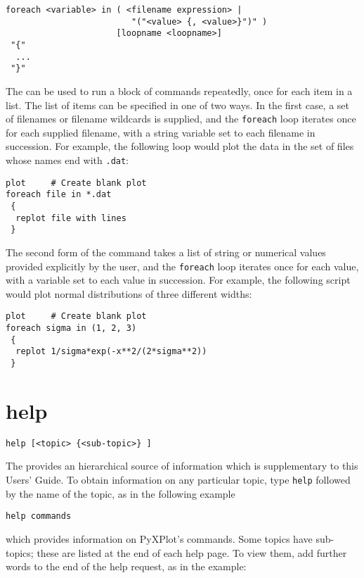 \begin{verbatim}
foreach <variable> in ( <filename expression> |
                         "("<value> {, <value>}")" )
                      [loopname <loopname>]
 "{"
  ...
 "}"
\end{verbatim}

The  can be used to run a block of commands repeatedly, once
for each item in a list.  The list of items can be specified in one of two
ways.  In the first case, a set of filenames or filename wildcards is supplied,
and the {\tt foreach} loop iterates once for each supplied filename, with a
string variable set to each filename in succession.  For example, the following
loop would plot the data in the set of files whose names end with {\tt .dat}:

\begin{verbatim}
plot     # Create blank plot
foreach file in *.dat
 {
  replot file with lines
 }
\end{verbatim}

The second form of the command takes a list of string or numerical values
provided explicitly by the user, and the {\tt foreach} loop iterates once for
each value, with a variable set to each value in succession.  For example, the
following script would plot normal distributions of three different widths:

\begin{verbatim}
plot     # Create blank plot
foreach sigma in (1, 2, 3)
 {
  replot 1/sigma*exp(-x**2/(2*sigma**2))
 }
\end{verbatim}


\section{help}

\begin{verbatim}
help [<topic> {<sub-topic>} ]
\end{verbatim}

The  provides an hierarchical source of information which is
supplementary to this Users' Guide.  To obtain information on any particular
topic, type {\tt help} followed by the name of the topic, as in the following
example

\begin{verbatim}
help commands
\end{verbatim}

\noindent which provides information on PyXPlot's commands. Some topics have
sub-topics; these are listed at the end of each help page. To view them, add
further words to the end of the help request, as in the example:

